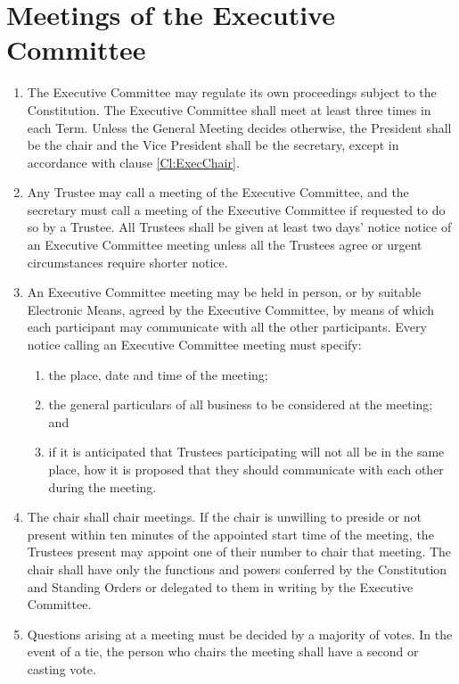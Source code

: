 \documentclass[11pt,a4paper, oneside]{memoir}
\begin{document}
	\section{Meetings of the Executive Committee} \label{Art:TrusteeDecisions}
	\begin{enumerate}
		\item The Executive Committee may regulate its own proceedings subject to the Constitution.  The Executive Committee shall meet at least three times in each Term.
		Unless the General Meeting decides otherwise, the President shall be the chair and the Vice President shall be the secretary, except in accordance with clause \ref{Cl:ExecChair}. 
		\item Any Trustee may call a meeting of the Executive Committee, and the secretary must call a meeting of the Executive Committee if requested to do so by a Trustee.
		All Trustees shall be given at least two days' notice notice of an Executive Committee meeting unless all the Trustees agree or urgent circumstances require shorter notice.
		\item An Executive Committee meeting may be held in person, or by suitable Electronic Means, agreed by the Executive Committee, by means of which each participant may communicate with all the other participants.
		Every notice calling an Executive Committee meeting must specify:
		\begin{enumerate}
			\item the place, date and time of the meeting;
			\item the general particulars of all business to be considered at the meeting; and
			\item if it is anticipated that Trustees participating will not all be in the same place, how it is proposed that they should communicate with each other during the meeting.
		\end{enumerate}
		\item \label{Cl:ExecChair} The chair shall chair meetings.
		If the chair is unwilling to preside or not present within ten minutes of the appointed start time of the meeting, the Trustees present may appoint one of their number to chair that meeting.
		The chair shall have only the functions and powers conferred by the Constitution and Standing Orders or delegated to them in writing by the Executive Committee.
		\item Questions arising at a meeting must be decided by a majority of votes.
		In the event of a tie, the person who chairs the meeting shall have a second or casting vote.

\end{enumerate}
\end{document}
